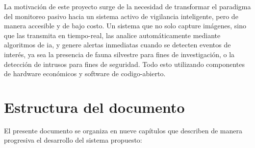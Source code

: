 \documentclass[a4paper, 12pt]{report}
\begin{document}
La motivación de este proyecto surge de la necesidad de transformar el
paradigma del monitoreo pasivo hacia un sistema activo de vigilancia
inteligente, pero de manera accesible y de bajo costo. Un sistema que
no solo capture imágenes, sino que las transmita en \gls{tiempo-real}, las
analice automáticamente mediante algoritmos de \gls{ia}, y genere alertas
inmediatas cuando se detecten eventos de interés, ya sea la presencia
de fauna silvestre para fines de investigación, o la detección de intrusos
para fines de seguridad. Todo esto utilizando componentes de hardware
económicos y software de \gls{codigo-abierto}.

\section{Estructura del documento}

El presente documento se organiza en nueve capítulos que describen de
manera progresiva el desarrollo del sistema propuesto:
\end{document}

